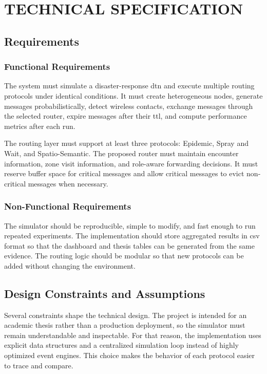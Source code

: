 \chapter{\MakeUppercase{Technical Specification}}

\section{Requirements}
\subsection{Functional Requirements}
The system must simulate a disaster-response \ac{dtn} and execute multiple routing protocols under identical conditions. It must create heterogeneous nodes, generate messages probabilistically, detect wireless contacts, exchange messages through the selected router, expire messages after their \ac{ttl}, and compute performance metrics after each run.

The routing layer must support at least three protocols: Epidemic, Spray and Wait, and Spatio-Semantic. The proposed router must maintain encounter information, zone visit information, and role-aware forwarding decisions. It must reserve buffer space for critical messages and allow critical messages to evict non-critical messages when necessary.

\subsection{Non-Functional Requirements}
The simulator should be reproducible, simple to modify, and fast enough to run repeated experiments. The implementation should store aggregated results in \ac{csv} format so that the dashboard and thesis tables can be generated from the same evidence. The routing logic should be modular so that new protocols can be added without changing the environment.

\section{Design Constraints and Assumptions}
Several constraints shape the technical design. The project is intended for an academic thesis rather than a production deployment, so the simulator must remain understandable and inspectable. For that reason, the implementation uses explicit data structures and a centralized simulation loop instead of highly optimized event engines. This choice makes the behavior of each protocol easier to trace and compare.

